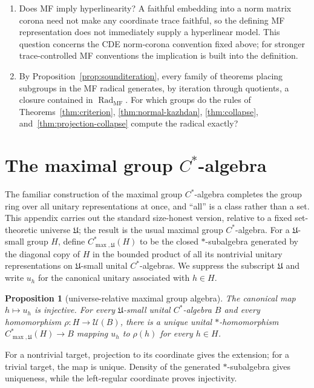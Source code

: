 \documentclass[11pt]{amsart}
\newcommand{\leanverified}[2]{\ignorespaces}
\newtheorem{proposition}[theorem]{Proposition}
\theoremstyle{definition}
\theoremstyle{remark}
\theoremstyle{plain}
\newcommand{\U}{\mathcal U}
\begin{document}
\begin{enumerate}
\item Does MF imply hyperlinearity?  A faithful embedding into a norm
matrix corona need not make any coordinate trace faithful, so the defining
MF representation does not immediately supply a hyperlinear model.  This
question concerns the CDE norm-corona convention fixed above; for stronger
trace-controlled MF conventions the implication is built into the definition.
\item By Proposition~\ref{prop:sounditeration}, every family of
theorems placing subgroups in the MF radical generates, by iteration
through quotients, a closure contained in
$\operatorname{Rad}_{\mathrm{MF}}$.  For which groups do the rules of
Theorems~\ref{thm:criterion}, \ref{thm:normal-kazhdan},
\ref{thm:collapse}, and~\ref{thm:projection-collapse} compute the
radical exactly?
\end{enumerate}
\section{The maximal group \texorpdfstring{$C^*$}{C*}-algebra}\label{app:maxcstar}

The familiar construction of the maximal group $C^*$-algebra
completes the group ring over all unitary representations at once,
and ``all'' is a class rather than a set.  This appendix carries out
the standard size-honest version, relative to a fixed set-theoretic
universe $\mathfrak U$; the result is the usual maximal group
$C^*$-algebra.  For a $\mathfrak U$-small
group $H$, define $C^{*}_{\max,\mathfrak U}(H)$ to be the closed
$*$-subalgebra generated by the diagonal copy of $H$ in the bounded product
of all its nontrivial unitary representations on $\mathfrak U$-small unital
$C^*$-algebras.  We suppress the
subscript $\mathfrak U$ and write $u_h$ for the canonical unitary
associated with $h\in H$.

\begin{proposition}[universe-relative maximal group algebra]
\label{prop:maximal-cstar}
The canonical map $h\mapsto u_h$ is injective.  For every
$\mathfrak U$-small unital $C^*$-algebra $B$ and every homomorphism
$\rho\colon H\to\U(B)$, there is a unique unital $*$-homomorphism
$C^{*}_{\max,\mathfrak U}(H)\to B$ mapping $u_h$ to $\rho(h)$ for
every $h\in H$.
\leanverified{Analysis/MaximalGroupCStar}{GroupApproximation.manuscriptUniverseRelativeMaximalGroupCStar}
\end{proposition}

For a nontrivial target, projection to its coordinate gives the extension;
for a trivial target, the map is unique.  Density of the generated
$*$-subalgebra gives uniqueness, while the left-regular coordinate proves
injectivity.
\end{document}
